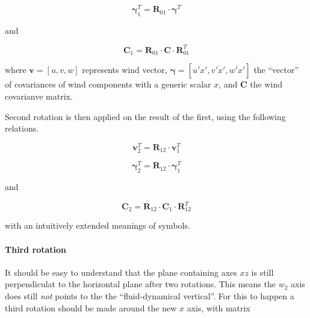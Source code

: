 \documentclass[a4paper,10pt]{book}
\begin{document}
\begin{equation}\label{eq:Transformation of scalar covariances in the first rotation}
  \mathbf{\gamma}_{1}^{T} = \mathbf{R}_{01} \cdot \mathbf{\gamma}^{T}
\end{equation} 

\noindent and

\begin{equation}\label{eq:Transformation of wind covariances in the first rotation}
  \mathbf{C}_{1} = \mathbf{R}_{01} \cdot \mathbf{C} \cdot \mathbf{R}_{01}^{T}
\end{equation} 

\noindent where $\mathbf{v} = \left[ u,v,w \right]$ represents wind vector, $\mathbf{\gamma} = \left[ \overline{u'x'}, \overline{v'x'}, \overline{w'x'} \right]$ the ``vector'' of covariances of wind components with a generic scalar $x$, and $\mathbf{C}$ the wind covarianve matrix.

Second rotation is then applied on the result of the first, using the following relations.

\begin{equation}\label{eq:Transformation of wind speed in the second rotation}
  \mathbf{v}_{2}^{T} = \mathbf{R}_{12} \cdot \mathbf{v}_{1}^{T}
\end{equation} 

\begin{equation}\label{eq:Transformation of scalar covariances in the second rotation}
  \mathbf{\gamma}_{2}^{T} = \mathbf{R}_{12} \cdot \mathbf{\gamma}_{1}^{T}
\end{equation} 

\noindent and

\begin{equation}\label{eq:Transformation of wind covariances in the second rotation}
  \mathbf{C}_{2} = \mathbf{R}_{12} \cdot \mathbf{C}_{1} \cdot \mathbf{R}_{12}^{T}
\end{equation} 

\noindent with an intuitively extended meanings of symbols.

\paragraph{Third rotation}
\label{sec:Third rotation}

It should be easy to understand that the plane containing axes $xz$ is still perpendiculat to the horizontal plane after two rotations. This means the $w_{2}$ axis does still \emph{not} points to the the ``fluid-dynamical vertical''. For this to happen a third rotation should be made around the new $x$ axis, with matrix
\end{document}
